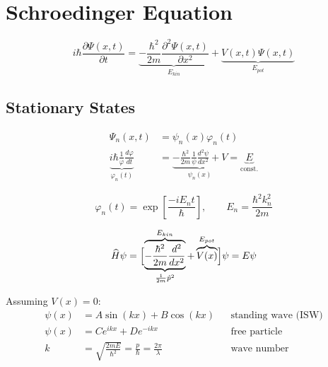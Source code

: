 \section{Schroedinger Equation}
\noindent\begin{equation*}
    i\hbar \frac{\partial \Psi(x,t)}{\partial t}           = \underbrace{- \frac{\hbar^2}{2m} \frac{\partial^2 \Psi(x,t)}{\partial x^2}}_{E_{kin}} + \underbrace{V(x,t)\Psi(x,t)}_{E_{pot}}
\end{equation*}

\subsection{Stationary States}
\noindent\begin{align*}
    \Psi_n(x,t)                                                        & = \psi_n(x)\varphi_n(t)                                                                                         \\
    \underbrace{i\hbar\frac1\varphi\frac{d\varphi}{dt}}_{\varphi_n(t)} & =\underbrace{-\frac{\hbar^2}{2m}\frac1\psi\frac{d^2\psi}{dx^2}+V}_{\psi_n (x)} = \underbrace{E}_{\text{const.}}
\end{align*}

\noindent\begin{equation*}
    \varphi_n(t) =\exp\left[\frac{-iE_n t}{\hbar}\right], \qquad E_n = \frac{\hbar^2 k_n^2}{2m}
\end{equation*}

\noindent\begin{equation*}
    \widehat{H}\psi  = \Bigl[\overbrace{\underbrace{-\frac{\hbar^2}{2m}\frac{d^2}{dx^2}}_{\frac{1}{2m}\hat{p}^2}}^{E_{kin}}+ \overbrace{V(x)}^{E_{pot}}\Bigr]\psi = E\psi
\end{equation*}

\newpar{}
Assuming $V(x) = 0$:
\noindent\begin{align*}
    \psi(x) & =A\sin(kx)+B\cos(kx)                                               &  & \text{standing wave (ISW)} \\
    \psi(x) & =Ce^{ikx}+De^{-ikx}                                                &  & \text{free particle}       \\
    k       & =\sqrt{\frac{2mE}{\hbar^{2}}}=\frac{p}{\hbar}=\frac{2\pi}{\lambda} &  & \text{wave number}
\end{align*}


